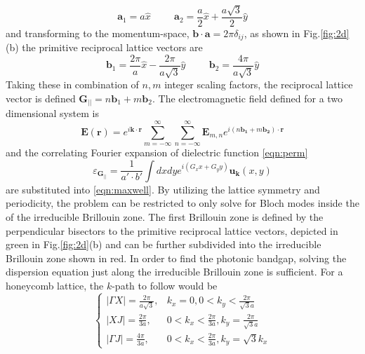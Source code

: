 \begin{equation}
	\boldsymbol{a}_1 = a\hat{x} \hspace{1cm} \boldsymbol{a}_2 = \frac{a}{2}\hat{x}+\frac{a\sqrt{3}}{2}\hat{y}
\end{equation}
and transforming to the momentum-space,  $\boldsymbol{b}\cdot\boldsymbol{a} = 2\pi\delta_{ij}$, as shown in Fig.\ref{fig:2d}(b) the primitive reciprocal lattice vectors are
\begin{equation}
	\boldsymbol{b}_1 = \frac{2\pi}{a}\hat{x}-\frac{2\pi}{a\sqrt{3}}\hat{y} \hspace{1cm} \boldsymbol{b}_2 =\frac{4\pi}{a\sqrt{3}}\hat{y}
\end{equation}
Taking these in combination of $n, m$ integer scaling factors, the reciprocal lattice vector is defined $\boldsymbol{G_{||}} = n\boldsymbol{b}_1 + m\boldsymbol{b}_2$.
The electromagnetic field defined for a two dimensional system is
\begin{equation}
	\boldsymbol{E}(\boldsymbol{r}) = e^{i\boldsymbol{k}\cdot\boldsymbol{r}}
	\sum_{m=-\infty}^\infty\sum_{n=-\infty}^\infty\boldsymbol{E}_{m,n}
	e^{i(n\boldsymbol{b_1}+m\boldsymbol{b_2})\cdot\boldsymbol{r}}
	\label{eqn:2d_emf}
\end{equation}
and the correlating Fourier expansion of dielectric function \eqref{eqn:perm}
\begin{equation}
	\varepsilon_{\boldsymbol{G_{||}}} = \frac{1}{a'\cdot b'}\int dxdye^{i(G_xx + G_yy)}\boldsymbol{u_k}(x, y)
	\label{eqn:2d_perm}
\end{equation}
are substituted into \eqref{eqn:maxwell}.
By utilizing the lattice symmetry and periodicity, the problem can be restricted to only solve for Bloch modes inside the of the irreducible Brillouin zone.
The first Brillouin zone is defined by the perpendicular bisectors to the primitive reciprocal lattice vectors, depicted in green in Fig.\ref{fig:2d}(b) and can be further subdivided into the irreducible Brillouin zone shown in red.
In order to find the photonic bandgap, solving the dispersion equation just along the irreducible Brillouin zone is sufficient.
For a honeycomb lattice, the $k$-path to follow would be
\begin{equation}
	\begin{cases}
		|\Gamma X| = \frac{2\pi}{a\sqrt{3}}, & k_x=0, 0<k_y<\frac{2\pi}{\sqrt{3}a}               \\
		|XJ| =  \frac{2\pi}{3a},             & 0<k_x<\frac{2\pi}{3a}, k_y=\frac{2\pi}{\sqrt{3}a} \\
		|\Gamma J| = \frac{4\pi}{3a},        & 0<k_x<\frac{2\pi}{3a}, k_y=\sqrt{3}k_x
	\end{cases}
\end{equation}
